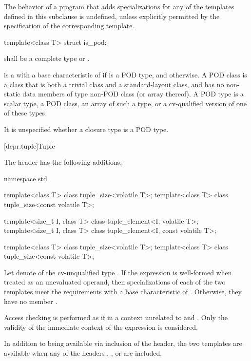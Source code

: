 \pnum
The behavior of a program that adds specializations for
any of the templates defined in this subclause is undefined,
unless explicitly permitted by the specification of the corresponding template.

\begin{itemdecl}
template<class T> struct is_pod;
\end{itemdecl}

\begin{itemdescr}
\pnum
\requires
{} shall be a complete type or \cv{} .

\pnum
{} is a 
with a base characteristic of 
if  is a POD type,
and  otherwise.
%
A POD class is a class that is both a trivial class and a standard-layout class,
and has no non-static data members of type non-POD class (or array thereof).
A POD type is a scalar type, a POD class, an array of such a type,
or a cv-qualified version of one of these types.

\pnum
\begin{note}
It is unspecified whether a closure type is a POD type.
\end{note}
\end{itemdescr}

[depr.tuple]{Tuple}

\pnum
The header  has the following additions:
\begin{codeblock}
namespace std {
  template<class T> class tuple_size<volatile T>;
  template<class T> class tuple_size<const volatile T>;

  template<size_t I, class T> class tuple_element<I, volatile T>;
  template<size_t I, class T> class tuple_element<I, const volatile T>;
}
\end{codeblock}

\begin{itemdecl}
template<class T> class tuple_size<volatile T>;
template<class T> class tuple_size<const volatile T>;
\end{itemdecl}

\begin{itemdescr}
\pnum
Let  denote  of the cv-unqualified type .
If the expression  is well-formed
when treated as an unevaluated operand,
then specializations of each of the two templates meet
the  requirements with a base characteristic of
.
Otherwise, they have no member .

\pnum
Access checking is performed as if
in a context unrelated to  and .
Only the validity of the immediate context of the expression is considered.

\pnum
In addition to being available via inclusion of the  header,
the two templates are available when any of the headers
,
, or
are included.
\end{itemdescr}

